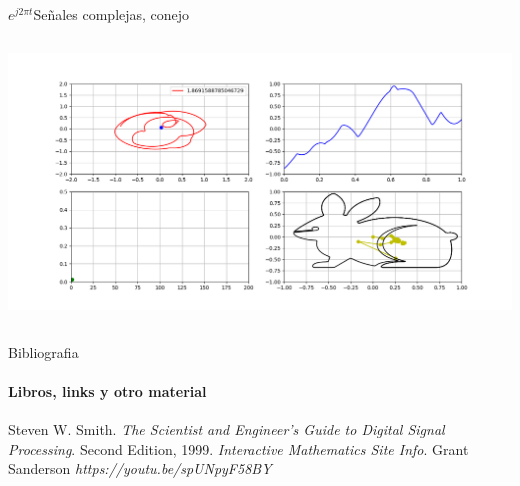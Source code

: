 \begin{frame}{$e^{j2\pi t}$}{Señales complejas, conejo}
   \handsonicon
   \begin{columns}[onlytextwidth]
      
      
      \centering\includegraphics[width=1.0\textwidth]{2_clase/euler6}
   \end{columns}
   \vfill
\end{frame}
\begin{frame}{Bibliografia}
   \framesubtitle{Libros, links y otro material}
   \begin{thebibliography}{9}
         Steven W. Smith.
         \emph{The Scientist and Engineer's Guide to Digital Signal Processing}.
         Second Edition, 1999.
         \emph{Interactive Mathematics Site Info}.
         Grant Sanderson
         \emph{ https://youtu.be/spUNpyF58BY}
   \end{thebibliography}
\end{frame}

